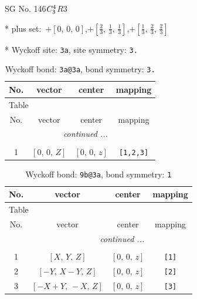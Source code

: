 \documentclass[fleqn,8pt]{jsarticle}
\begin{document}
\setcounter{MaxMatrixCols}{32}

\renewcommand{\tablename}{Table~}
\renewcommand{\figurename}{Figure~}
\begin{center}
\LARGE
SG No. 146\quad$C_{\rm 3}^{4}$\quad$R3$\quad[ trigonal ]
\end{center}

* plus set:\,\,\,$+\left[ 0,\, 0,\, 0 \right]$,\quad $+\left[ \frac{2}{3},\, \frac{1}{3},\, \frac{1}{3} \right]$,\quad $+\left[ \frac{1}{3},\, \frac{2}{3},\, \frac{2}{3} \right]$


* Wyckoff site: {\tt 3a}, site symmetry: {\tt 3.}
\renewcommand{\arraystretch}{1.2}
\begin{longtable}{cccc}
\caption{Wyckoff bond: {\tt 3a@3a}, bond symmetry: {\tt 3.}}
 \\
 \hline \hline
No. & vector & center & mapping \\ \hline \endfirsthead

\multicolumn{3}{l}{\tablename\ \thetable{}} \\
 \hline \hline
No. & vector & center & mapping \\ \hline \endhead

 \hline \hline
\multicolumn{3}{r}{\footnotesize\it continued ...} \\ \endfoot

 \hline \hline
\multicolumn{3}{r}{} \\ \endlastfoot

1 & $\left[ 0,\, 0,\, Z \right]$ & $\left[ 0,\, 0,\, z \right]$ & {\tt [1,2,3]} \\
\end{longtable}
\renewcommand{\arraystretch}{1.2}
\begin{longtable}{cccc}
\caption{Wyckoff bond: {\tt 9b@3a}, bond symmetry: {\tt 1}}
 \\
 \hline \hline
No. & vector & center & mapping \\ \hline \endfirsthead

\multicolumn{3}{l}{\tablename\ \thetable{}} \\
 \hline \hline
No. & vector & center & mapping \\ \hline \endhead

 \hline \hline
\multicolumn{3}{r}{\footnotesize\it continued ...} \\ \endfoot

 \hline \hline
\multicolumn{3}{r}{} \\ \endlastfoot

1 & $\left[ X,\, Y,\, Z \right]$ & $\left[ 0,\, 0,\, z \right]$ & {\tt [1]} \\ \hline
2 & $\left[ - Y,\, X - Y,\, Z \right]$ & $\left[ 0,\, 0,\, z \right]$ & {\tt [2]} \\ \hline
3 & $\left[ - X + Y,\, - X,\, Z \right]$ & $\left[ 0,\, 0,\, z \right]$ & {\tt [3]} \\
\end{longtable}
\end{document}
